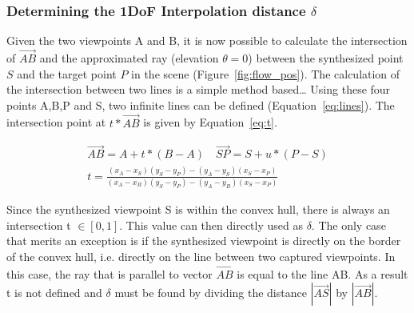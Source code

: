 \subsubsection{Determining the 1DoF Interpolation distance $\delta$}
Given the two viewpoints A and B, it is now possible to calculate the intersection of $\overrightarrow{AB}$ and the approximated ray (elevation $\theta = 0$) between the synthesized point $S$ and the target point $P$ in the scene (Figure~\ref{fig:flow_pos}). The calculation of the intersection between two lines is a simple method based\ldots{} Using these four points A,B,P and S, two infinite lines can be defined (Equation~\ref{eq:lines}). The intersection point at $t * \overrightarrow{AB}$ is given by Equation~\ref{eq:t}.

\begin{align}
  \overrightarrow{AB} = A + t * (B-A) \quad \overrightarrow{SP} = S + u * (P-S) \label{eq:lines} \\
  t = \frac{(x_A - x_S)(y_S - y_P) - (y_A - y_S)(x_S - x_P)}{(x_A - x_B)(y_S - y_P) - (y_A - y_B)(x_S - x_P)} \label{eq:t}
\end{align}

Since the synthesized viewpoint S is within the convex hull, there is always an intersection t $\in [0,1]$. This value can then directly used as $\delta$. The only case that merits an exception is if the synthesized viewpoint is directly on the border of the convex hull, i.e. directly on the line between two captured viewpoints. In this case, the ray that is parallel to vector $\overrightarrow{AB}$ is equal to the line AB. As a result t is not defined and $\delta$ must be found by dividing the distance $|\overrightarrow{AS}|$ by $|\overrightarrow{AB}|$.

